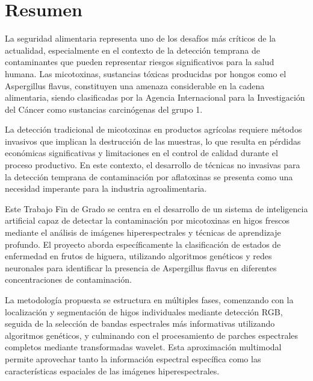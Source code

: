 \renewcommand{\keywords}{{\itshape \bfseries Palabras clave - }}
\chapter*{Resumen} 

La seguridad alimentaria representa uno de los desafíos más críticos de la actualidad, especialmente en el contexto de la detección temprana de contaminantes que pueden representar riesgos significativos para la salud humana. Las micotoxinas, sustancias tóxicas producidas por hongos como el Aspergillus flavus, constituyen una amenaza considerable en la cadena alimentaria, siendo clasificadas por la Agencia Internacional para la Investigación del Cáncer como sustancias carcinógenas del grupo 1.

\vspace{5mm}

La detección tradicional de micotoxinas en productos agrícolas requiere métodos invasivos que implican la destrucción de las muestras, lo que resulta en pérdidas económicas significativas y limitaciones en el control de calidad durante el proceso productivo. En este contexto, el desarrollo de técnicas no invasivas para la detección temprana de contaminación por aflatoxinas se presenta como una necesidad imperante para la industria agroalimentaria.

\vspace{5mm}

Este Trabajo Fin de Grado se centra en el desarrollo de un sistema de inteligencia artificial capaz de detectar la contaminación por micotoxinas en higos frescos mediante el análisis de imágenes hiperespectrales y técnicas de aprendizaje profundo. El proyecto aborda específicamente la clasificación de estados de enfermedad en frutos de higuera, utilizando algoritmos genéticos y redes neuronales para identificar la presencia de Aspergillus flavus en diferentes concentraciones de contaminación.

\vspace{5mm}

La metodología propuesta se estructura en múltiples fases, comenzando con la localización y segmentación de higos individuales mediante detección RGB, seguida de la selección de bandas espectrales más informativas utilizando algoritmos genéticos, y culminando con el procesamiento de parches espectrales completos mediante transformadas wavelet. Esta aproximación multimodal permite aprovechar tanto la información espectral específica como las características espaciales de las imágenes hiperespectrales.

